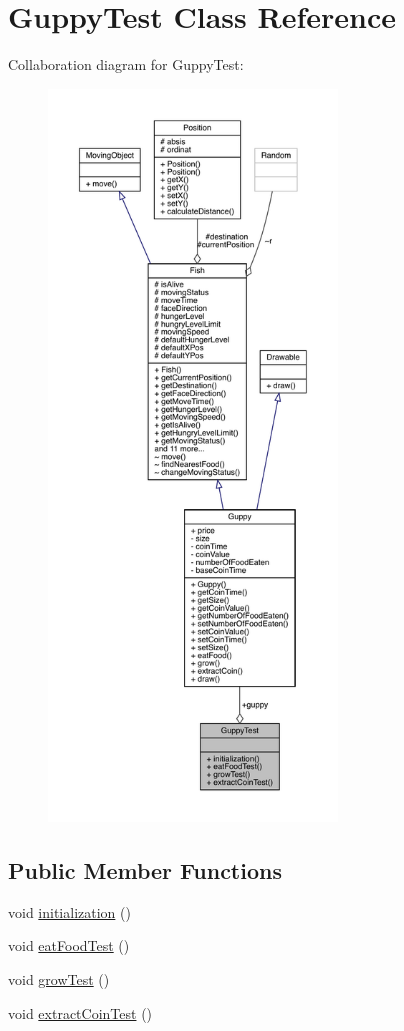 \hypertarget{class_guppy_test}{}\section{Guppy\+Test Class Reference}
\label{class_guppy_test}


Collaboration diagram for Guppy\+Test\+:
\nopagebreak
\begin{figure}[H]
\begin{center}
\leavevmode
\includegraphics[height=550pt]{class_guppy_test__coll__graph}
\end{center}
\end{figure}
\subsection*{Public Member Functions}
\begin{DoxyCompactItemize}
\item 
void \mbox{\hyperlink{class_guppy_test_a3f926a2bb6bae5ccb6e0ded7b53bfaa7}{initialization}} ()
\item 
void \mbox{\hyperlink{class_guppy_test_ac5810161de817b76932be0c2264a0980}{eat\+Food\+Test}} ()
\item 
void \mbox{\hyperlink{class_guppy_test_aee7d947a05b64664dfdfd646325d3b8a}{grow\+Test}} ()
\item 
void \mbox{\hyperlink{class_guppy_test_a1277dd581c572d4125b0599e144f726b}{extract\+Coin\+Test}} ()
\end{DoxyCompactItemize}
